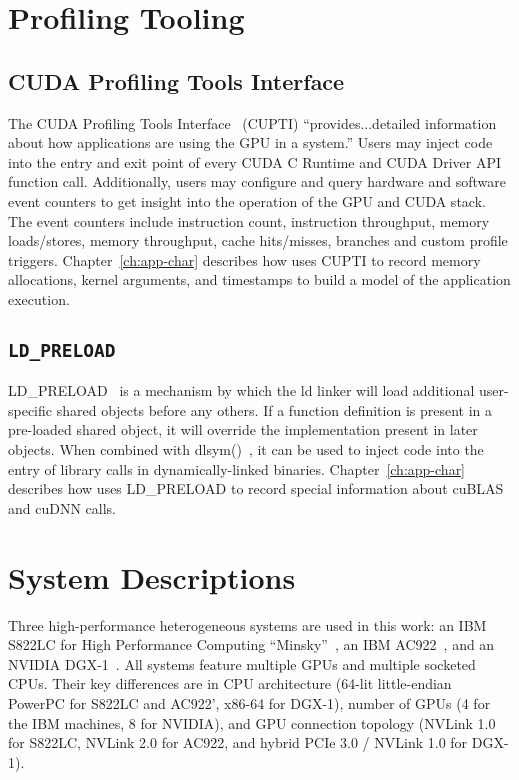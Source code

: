 \section{Profiling Tooling}
\label{sec:profiling}

\subsection{CUDA Profiling Tools Interface}
\label{sec:cupti}

The CUDA Profiling Tools Interface~\cite{nvidia2017cupti} (CUPTI) ``provides...detailed information about how applications are using the GPU in a system.''
Users may inject code into the entry and exit point of every CUDA C Runtime and CUDA Driver API function call.
Additionally, users may configure and query hardware and software event counters to get insight into the operation of the GPU and CUDA stack.
The event counters include instruction count, instruction throughput, memory loads/stores, memory throughput, cache hits/misses, branches and custom profile triggers.
Chapter~\ref{ch:app-char} describes how  uses CUPTI to record memory allocations, kernel arguments, and timestamps to build a model of the application execution.

\subsection{\texttt{LD\_PRELOAD}}
\label{sec:ldpreload}

LD\_PRELOAD~\cite{kerrisk2017ld} is a mechanism by which the ld linker will load additional user-specific shared objects before any others.
If a function definition is present in a pre-loaded shared object, it will override the implementation present in later objects.
When combined with dlsym()~\cite{kerrisk2017dlysm}, it can be used to inject code into the entry of library calls in dynamically-linked binaries.
Chapter~\ref{ch:app-char} describes how  uses LD\_PRELOAD to record special information about cuBLAS and cuDNN calls.







\section{System Descriptions}
\label{ref:system-description}

Three high-performance heterogeneous systems are used in this work: an IBM S822LC for High Performance Computing ``Minsky''~\cite{caldeira2016s822lc}, an IBM AC922~\cite{caldeira2018ac922}, and an NVIDIA DGX-1~\cite{nvidia2016dgx1}.
All systems feature multiple GPUs and multiple socketed CPUs.
Their key differences are in CPU architecture (64-lit little-endian PowerPC for S822LC and AC922', x86-64 for DGX-1), number of GPUs (4 for the IBM machines, 8 for NVIDIA), and GPU connection topology (NVLink 1.0 for S822LC, NVLink 2.0 for AC922, and hybrid PCIe 3.0 / NVLink 1.0 for DGX-1).


